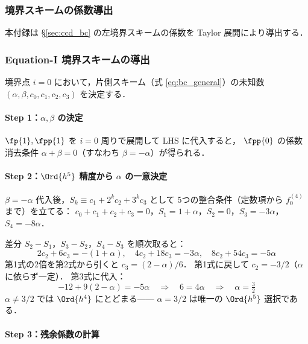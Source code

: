 \subsubsection{境界スキームの係数導出}
\label{app:ccd_bc_derivation}

本付録は §\ref{sec:ccd_bc} の左境界スキームの係数を Taylor 展開により導出する．

\subsubsection{Equation-I 境界スキームの導出}
\label{app:ccd_bc_derivation_I}

境界点 $i=0$ において，片側スキーム（式 \eqref{eq:bc_general}）の未知数
$(\alpha, \beta, c_0, c_1, c_2, c_3)$ を決定する．

\paragraph{Step 1：$\alpha, \beta$ の決定}

$\fp{1}, \fpp{1}$ を $i=0$ 周りで展開して LHS に代入すると，
$\fpp{0}$ の係数消去条件 $\alpha + \beta = 0$（すなわち $\beta = -\alpha$）が得られる．

\paragraph{Step 2：$\Ord{h^5}$ 精度から $\alpha$ の一意決定}

$\beta = -\alpha$ 代入後，$S_k \equiv c_1 + 2^k c_2 + 3^k c_3$ として
5つの整合条件（定数項から $f^{(4)}_0$ まで）を立てる：
$c_0{+}c_1{+}c_2{+}c_3=0$，$S_1=1{+}\alpha$，$S_2=0$，$S_3=-3\alpha$，$S_4=-8\alpha$．

差分 $S_2{-}S_1$，$S_3{-}S_2$，$S_4{-}S_3$ を順次取ると：
\[
  2c_2+6c_3 = -(1+\alpha),\quad
  4c_2+18c_3 = -3\alpha,\quad
  8c_2+54c_3 = -5\alpha
\]
第1式の2倍を第2式から引くと $c_3 = (2-\alpha)/6$．
第1式に戻して $c_2 = -3/2$（$\alpha$ に依らず一定）．
第3式に代入：
\[
  -12 + 9(2-\alpha) = -5\alpha
  \quad\Longrightarrow\quad
  6 = 4\alpha
  \quad\Longrightarrow\quad
  \boxed{\alpha = \tfrac{3}{2}}
\]
$\alpha \neq 3/2$ では $\Ord{h^4}$ にとどまる—— $\alpha = 3/2$ は唯一の $\Ord{h^5}$ 選択である．

\paragraph{Step 3：残余係数の計算}


